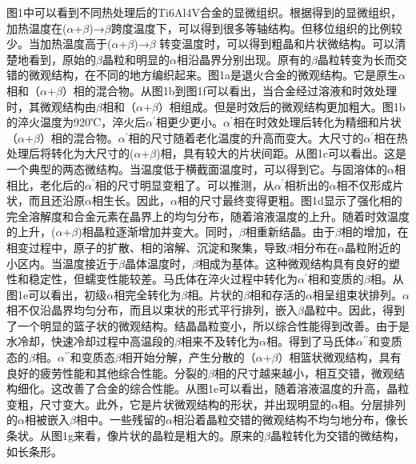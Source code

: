 图1中可以看到不同热处理后的Ti6Al4V合金的显微组织。根据得到的显微组织，加热温度在($\alpha$+$\beta$)→$\beta$跨度温度下，可以得到很多等轴结构。但移位组织的比例较少。当加热温度高于($\alpha$+$\beta$)→$\beta$ 转变温度时，可以得到粗晶和片状微结构。可以清楚地看到，原始的$\beta$晶粒和明显的$\alpha$相沿晶界分别出现。原有的$\beta$晶粒转变为长而交错的微观结构，在不同的地方编织起来。图1a是退火合金的微观结构。它是原生$\alpha$相和（$\alpha$+$\beta$）相的混合物。从图1b到图1f可以看出，当合金经过溶液和时效处理时，其微观结构由$\beta$相和（$\alpha$+$\beta$）相组成。但是时效后的微观结构更加粗大。图1b的淬火温度为920℃，淬火后$\alpha^\prime$相更少更小。$\alpha^\prime$相在时效处理后转化为精细和片状（$\alpha$+$\beta$）相的混合物。$\alpha^\prime$相的尺寸随着老化温度的升高而变大。大尺寸的$\alpha^\prime$相在热处理后将转化为大尺寸的($\alpha$+$\beta$)相，具有较大的片状间距。从图1c可以看出。这是一个典型的两态微结构。当温度低于横截面温度时，可以得到它。与固溶体的$\alpha$相相比，老化后的$\alpha^\prime$相的尺寸明显变粗了。可以推测，从$\alpha^\prime$相析出的$\alpha$相不仅形成片状，而且还沿原$\alpha$相生长。因此，$\alpha$相的尺寸最终变得更粗。图1d显示了强化相的完全溶解度和合金元素在晶界上的均匀分布，随着溶液温度的上升。随着时效温度的上升，($\alpha$+$\beta$)相晶粒逐渐增加并变大。同时，$\beta$相重新结晶。由于$\beta$相的增加，在相变过程中，原子的扩散、相的溶解、沉淀和聚集，导致$\beta$相分布在$\alpha$晶粒附近的小区内。当温度接近于$\beta$晶体温度时，$\beta$相成为基体。这种微观结构具有良好的塑性和稳定性，但蠕变性能较差。马氏体在淬火过程中转化为$\alpha^\prime$相和变质的$\beta$相。从图1e可以看出，初级$\alpha$相完全转化为$\beta$相。片状的$\beta$相和存活的$\alpha$相呈组束状排列。$\alpha$相不仅沿晶界均匀分布，而且以束状的形式平行排列，嵌入$\beta$晶粒中。因此，得到了一个明显的篮子状的微观结构。结晶晶粒变小，所以综合性能得到改善。由于是水冷却，快速冷却过程中高温段的$\beta$相来不及转化为$\alpha$相。得到了马氏体$\alpha^{\prime\prime}$和变质态的$\beta$相。$\alpha^{\prime\prime}$和变质态$\beta$相开始分解，产生分散的（$\alpha$+$\beta$）相篮状微观结构，具有良好的疲劳性能和其他综合性能。分裂的$\beta$相的尺寸越来越小，相互交错，微观结构细化。这改善了合金的综合性能。从图1e可以看出，随着溶液温度的升高，晶粒变粗，尺寸变大。此外，它是片状微观结构的形状，并出现明显的$\alpha$相。分层排列的$\alpha$相被嵌入$\beta$相中。一些残留的$\alpha$相沿着晶粒交错的微观结构不均匀地分布，像长条状。从图1g来看，像片状的晶粒是粗大的。原来的$\beta$晶粒转化为交错的微结构，如长条形。

